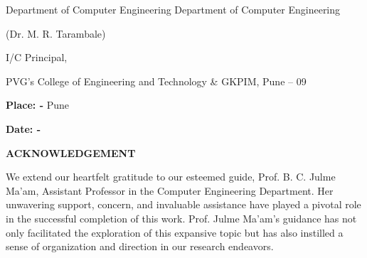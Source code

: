 \documentclass[12pt]{article}
\begin{document}
\begin{center}
\begin{flushleft} \hspace{0pt}  Department of Computer Engineering  \hspace{10pt}  Department of Computer Engineering
 \end{flushleft}
\vspace{10mm}
\begin{flushleft}
    \hspace{150pt} (Dr. M. R. Tarambale)
\end{flushleft}
\begin{flushleft}
    \hspace{165pt} I/C Principal,
    \noindent
\end{flushleft}
\begin{flushleft}
    \hspace{30pt} PVG’s College of Engineering and Technology \& GKPIM, Pune – 09
\end{flushleft}
\end{center}

\noindent\begin{flushleft}\textbf{Place: -} Pune  \end{flushleft}
\noindent\begin{flushleft}\textbf{Date: - } \end{flushleft}

\noindent

\noindent

\noindent

\noindent

\noindent

\noindent

\pagebreak{}

\noindent

\noindent

\noindent

\noindent  

\noindent

\noindent  

\noindent

\noindent

\noindent  

\noindent
\onehalfspacing
\begin{center} \fontsize{14}{14}\textbf{ ACKNOWLEDGEMENT } \end{center}

\justify
\hspace{5mm}We extend our heartfelt gratitude to our esteemed guide, Prof. B. C. Julme Ma’am, Assistant Professor in the Computer Engineering Department. Her unwavering support, concern, and invaluable assistance have played a pivotal role in the successful completion of this work. Prof. Julme Ma’am's guidance has not only facilitated the exploration of this expansive topic but has also instilled a sense of organization and direction in our research endeavors.\\
\end{document}
